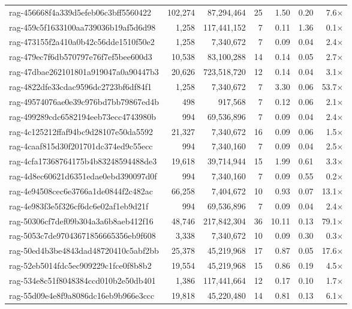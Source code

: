 \begin{table}[h!]
\begin{tabular}{lrrrrrr}
rag-456668f4a339d5efeb06c3bff5560422 & 102,274 & 87,294,464 & 25 & 1.50 & 0.20 & 7.6$\times$ \\
rag-459c5f1633100aa739036b19af5d6d98 & 1,258 & 117,441,152 & 7 & 0.11 & 1.36 & 0.1$\times$ \\
rag-473155f2a410a0b42c56dde1510f50e2 & 1,258 & 7,340,672 & 7 & 0.09 & 0.04 & 2.4$\times$ \\
rag-479ec7f6db570797e76f7ef5bee600d3 & 10,538 & 83,100,288 & 14 & 0.14 & 0.05 & 2.7$\times$ \\
rag-47dbae262101801a919047a0a90447b3 & 20,626 & 723,518,720 & 12 & 0.14 & 0.04 & 3.1$\times$ \\
rag-4822dfe33cdac9596dc2723bf6df84f1 & 1,258 & 7,340,672 & 7 & 3.30 & 0.06 & 53.7$\times$ \\
rag-49574076ae0e39c976bd7bb79867ed4b & 498 & 917,568 & 7 & 0.12 & 0.06 & 2.1$\times$ \\
rag-499289cdc6582194eeb73ecc4743980b & 994 & 69,536,896 & 7 & 0.09 & 0.04 & 2.4$\times$ \\
rag-4c125212ffaf94bc9d28107e50da5592 & 21,327 & 7,340,672 & 16 & 0.09 & 0.06 & 1.5$\times$ \\
rag-4caaf815d30f201701dc374ed9c55ecc & 994 & 7,340,160 & 7 & 0.09 & 0.04 & 2.5$\times$ \\
rag-4cfa17368764175b4b83248594488de3 & 19,618 & 39,714,944 & 15 & 1.99 & 0.61 & 3.3$\times$ \\
rag-4d8ec60621d6351edae0ebd390097d0f & 994 & 7,340,160 & 7 & 0.09 & 0.55 & 0.2$\times$ \\
rag-4e94508cec6e3766a1de0844f2c482ac & 66,258 & 7,404,672 & 10 & 0.93 & 0.07 & 13.1$\times$ \\
rag-4e983f3e5f326cf6dc6e02af1eb9d21f & 994 & 69,536,896 & 7 & 0.09 & 0.04 & 2.4$\times$ \\
rag-50306cf7def09b304a3a6b8aeb412f16 & 48,746 & 217,842,304 & 36 & 10.11 & 0.13 & 79.1$\times$ \\
rag-5053c7de97043671856665356eb9f608 & 3,338 & 7,340,672 & 10 & 0.09 & 0.30 & 0.3$\times$ \\
rag-50ed4b3be4843dad48720410c5abf2bb & 25,378 & 45,219,968 & 17 & 0.87 & 0.05 & 17.6$\times$ \\
rag-52eb5014fdc5ec909229c1fce0f8b8b2 & 19,554 & 45,219,968 & 15 & 0.86 & 0.19 & 4.5$\times$ \\
rag-534e8c51f8048384ccd010b2e50db401 & 1,386 & 117,441,664 & 12 & 0.17 & 0.10 & 1.7$\times$ \\
rag-55d09e4e8f9a8086dc16eb9b966e3ccc & 19,818 & 45,220,480 & 14 & 0.81 & 0.13 & 6.1$\times$ \\

\end{tabular}
\end{table}
